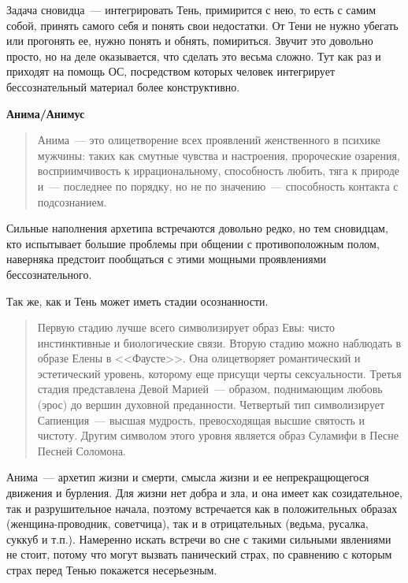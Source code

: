 \documentclass[a4paper,14pt,oneside]{memoir}
\begin{document}
Задача сновидца~--- интегрировать Тень, примирится с нею, то есть с самим собой, принять самого себя и понять свои недостатки. От Тени не нужно убегать или прогонять ее, нужно понять и обнять, помириться. Звучит это довольно просто, но на деле оказывается, что сделать это весьма сложно. Тут как раз и приходят на помощь ОС, посредством которых человек интегрирует бессознательный материал более конструктивно.

\begin{center}
\bfseries{Анима/Анимус}
\end{center} 


\begin{quotation}
Анима~--- это олицетворение всех проявлений женственного в психике мужчины: таких как смутные чувства и настроения, пророческие озарения, восприимчивость к иррациональному, способность любить, тяга к природе и~--- последнее по порядку, но не по значению~--- способность контакта с подсознанием. 
\end{quotation}

Сильные наполнения архетипа встречаются довольно редко, но тем сновидцам, кто испытывает большие проблемы при общении с противоположным полом, наверняка предстоит пообщаться с этими мощными проявлениями бессознательного.

Так же, как и Тень может иметь стадии осознанности.

\begin{quotation}
Первую стадию лучше всего символизирует образ Евы: чисто инстинктивные и биологические связи. Вторую стадию можно наблюдать в образе Елены в <<Фаусте>>. Она олицетворяет романтический и эстетический уровень, которому еще присущи черты сексуальности. Третья стадия представлена Девой Марией~--- образом, поднимающим любовь (эрос) до вершин духовной преданности. Четвертый тип символизирует Сапиенция~--- высшая мудрость, превосходящая высшие святость и чистоту. Другим символом этого уровня является образ Суламифи в Песне Песней Соломона. 
\end{quotation}

Анима~--- архетип жизни и смерти, смысла жизни и ее непрекращющегося движения и бурления. Для жизни нет добра и зла, и она имеет как созидательное, так и разрушительное начала, поэтому встречается как в положительных образах (женщина-проводник, советчица), так и в отрицательных (ведьма, русалка, суккуб и т.п.). Намеренно искать встречи во сне с такими сильными явлениями не стоит, потому что могут вызвать панический страх, по сравнению с которым страх перед Тенью покажется несерьезным.
\end{document}
